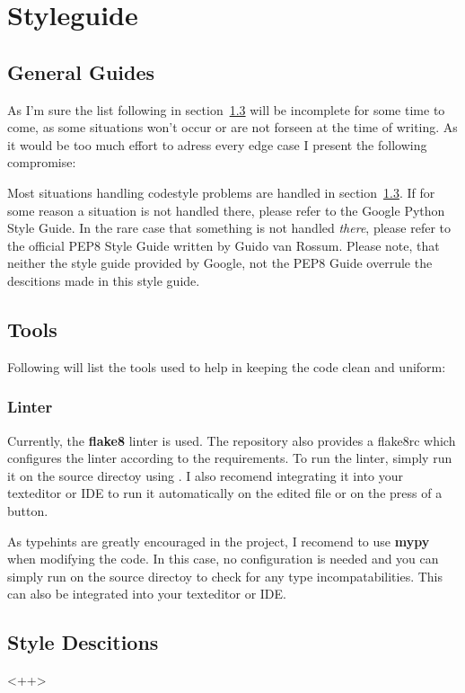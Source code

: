 \section{Styleguide}

\subsection{General Guides}
As I'm sure the list following in section~\ref{sub:descitions} will be
incomplete for some time to come, as some situations won't occur or are not
forseen at the time of writing. As it would be too much effort to adress every
edge case I present the following compromise:

Most situations handling codestyle problems are handled in
section~\ref{sub:descitions}. If for some reason a situation is not handled
there, please refer to the Google Python Style Guide. 
In the rare case that something is not handled \emph{there}, please refer to the
official PEP8 Style Guide written by Guido van Rossum.
Please note, that neither the style guide provided by Google, not the PEP8 Guide
overrule the descitions made in this style guide.

\subsection{Tools}
Following will list the tools used to help in keeping the code clean
and uniform:

\subsubsection{Linter}
Currently, the \textbf{flake8} linter is used. The repository also provides a
flake8rc which configures the linter according to the requirements. To run the
linter, simply run it on the source directoy using . I also
recomend integrating it into your texteditor or IDE to run it automatically
on the edited file or on the press of a button. 

As typehints are greatly encouraged in the project, I recomend to
use \textbf{mypy} when modifying the code. In this case, no configuration is
needed and you can simply run  on the source directoy to check
for any type incompatabilities. This can also be integrated into your
texteditor or IDE.

\subsection{Style Descitions}\label{sub:descitions}
<++>

